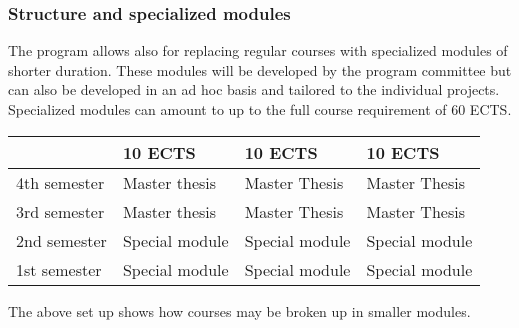 \documentclass{beamer}
\begin{document}
\begin{frame}
\frametitle{Structure and specialized modules}

\begin{block}{}
The program allows also for replacing regular courses with specialized modules of shorter duration.
These modules will be developed by the program committee but can also be developed in an ad hoc basis
and tailored to the individual projects. Specialized modules can amount to up to the full course requirement of 60 ECTS.



{\footnotesize
\begin{tabular}{llll}
\hline
\multicolumn{1}{l}{  } & \multicolumn{1}{l}{ 10 ECTS } & \multicolumn{1}{l}{ 10 ECTS } & \multicolumn{1}{l}{ 10 ECTS } \\
\hline
4th semester & Master thesis  & Master Thesis  & Master Thesis  \\
\hline
3rd semester & Master thesis  & Master Thesis  & Master Thesis  \\
\hline
2nd semester & Special module & Special module & Special module \\
\hline
1st semester & Special module & Special module & Special module \\
\hline
\end{tabular}
}

\noindent
The above set up shows how courses may be broken up in smaller modules.
\end{block}
\end{frame}
\end{document}
